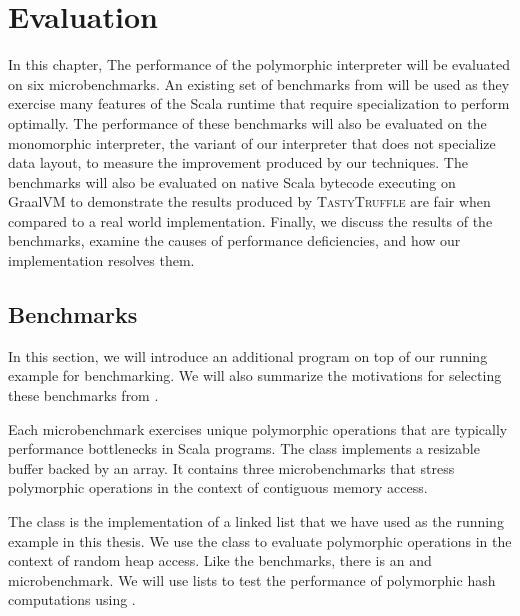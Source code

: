 \chapter{Evaluation}
\label{chapter:evaluation}
In this chapter, The performance of the polymorphic interpreter will be evaluated on six microbenchmarks.
An existing set of benchmarks from \cite{scala:miniboxing} will be used as they exercise many features of the Scala runtime that require specialization to perform optimally.
The performance of these benchmarks will also be evaluated on the monomorphic interpreter, the variant of our interpreter that does not specialize data layout, to measure the improvement produced by our techniques. 
The benchmarks will also be evaluated on native Scala bytecode executing on GraalVM to demonstrate the results produced by \textsc{TastyTruffle} are fair when compared to a real world implementation.
Finally, we discuss the results of the benchmarks, examine the causes of performance deficiencies, and how our implementation resolves them.

\section{Benchmarks}

In this section, we will introduce an additional program on top of our running example for benchmarking.
We will also summarize the motivations for selecting these benchmarks from \cite{scala:miniboxing}.

Each microbenchmark exercises unique polymorphic operations that are typically performance bottlenecks\cite{scala:collections-optimization,scala:dacapo} in Scala programs.
The  class implements a resizable buffer backed by an array.
It contains three microbenchmarks that stress polymorphic operations in the context of contiguous memory access.

The  class is the implementation of a linked list that we have used as the running example in this thesis.
We use the  class to evaluate polymorphic operations in the context of random heap access.
Like the  benchmarks, there is an  and  microbenchmark.
We will use lists to test the performance of polymorphic hash computations using .

